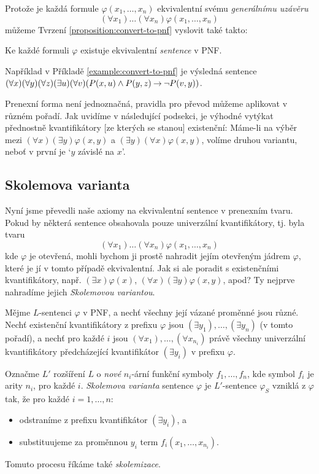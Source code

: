 Protože je každá formule $\varphi(x_1,\dots,x_n)$ ekvivalentní svému \emph{generálnímu uzávěru} $$(\forall x_1)\dots(\forall x_n)\varphi(x_1,\dots,x_n)$$ můžeme Tvrzení \ref{proposition:convert-to-pnf} vyslovit také takto:

\begin{corollary}
    Ke každé formuli $\varphi$ existuje ekvivalentní \emph{sentence} v PNF.
\end{corollary} 

Například v Příkladě \ref{example:convert-to-pnf} je výsledná sentence $(\forall x)(\forall y)(\forall z)(\exists u)(\forall v)( P(x,u)\land P(y,z)\mathbin{\rightarrow}\neg P(v,y))$.

\begin{remark}
    Prenexní forma není jednoznačná, pravidla pro převod můžeme aplikovat v různém pořadí. Jak uvidíme v následující podsekci, je výhodné vytýkat přednostně kvantifikátory [ze kterých se stanou] existenční: Máme-li na výběr mezi $(\forall x)(\exists y)\varphi(x,y)$ a $(\exists y)(\forall x)\varphi(x,y)$, volíme druhou variantu, neboť v první je `$y$ závislé na $x$'.
\end{remark}



\subsection{Skolemova varianta}

Nyní jsme převedli naše axiomy na ekvivalentní sentence v prenexním tvaru. Pokud by některá sentence obsahovala pouze univerzální kvantifikátory, tj. byla tvaru 
$$(\forall x_1)\dots(\forall x_n)\varphi(x_1,\dots,x_n)$$ 
kde $\varphi$ je otevřená, mohli bychom ji prostě nahradit jejím otevřeným jádrem $\varphi$, které je jí v tomto případě ekvivalentní. Jak si ale poradit s existenčními kvantifikátory, např. $(\exists x)\varphi(x)$, $(\forall x)(\exists y)\varphi(x,y)$, apod? Ty nejprve nahradíme jejich \emph{Skolemovou variantou}.

\begin{definition}
Mějme $L$-sentenci $\varphi$ v PNF, a nechť všechny její vázané proměnné jsou různé. Nechť existenční kvantifikátory z prefixu $\varphi$ jsou $(\exists y_1),\dots,(\exists y_n)$ (v tomto pořadí), a nechť pro každé $i$ jsou $(\forall x_1),\dots,(\forall x_{n_i})$ právě všechny univerzální kvantifikátory předcházející kvantifikátor $(\exists y_i)$ v prefixu $\varphi$. 

Označme $L'$ rozšíření $L$ o \emph{nové} $n_i$-ární funkční symboly $f_1,\dots,f_n$, kde symbol $f_i$ je arity $n_i$, pro každé $i$. \emph{Skolemova varianta} sentence $\varphi$ je $L'$-sentence $\varphi_S$ vzniklá z $\varphi$ tak, že pro každé $i=1,\dots,n$:
\begin{itemize}
    \item odstraníme z prefixu kvantifikátor $(\exists y_i)$, a
    \item substituujeme za proměnnou $y_i$ term $f_i(x_1,\dots,x_{n_i})$.
\end{itemize}
Tomuto procesu říkáme také \emph{skolemizace}.
\end{definition}

